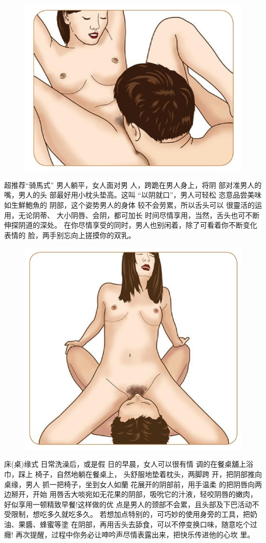 \documentclass[12pt,UTF8]{ctexbook}
\begin{document}
\begin{figure}[htbp]
	\centering
	\includegraphics[width=0.7\linewidth]{21}
	\caption{}
	\label{fig:1}
\end{figure}

超推荐“骑馬式”
男人躺平，女人面对男
人，跨跪在男人身上，将阴
部对准男人的嘴，男人的头
部最好用小枕头垫高。这叫
“以阴就口”，男人可轻松
恣意品尝美味如生鮮鮑魚的
阴部，这个姿势男人的身体
较不会劳累，所以舌头可以
很靈活的运用，无论阴蒂、
大小阴唇、会阴，都可加长
时间尽情享用，当然，舌头也可不断伸探阴道的深处。
在你尽情享受的同时，男人也别闲着，除了可看着你不断变化表情的
脸，两手别忘向上搓摸你的双乳。

\begin{figure}[htbp]
	\centering
	\includegraphics[width=0.7\linewidth]{22}
	\caption{}
	\label{fig:1}
\end{figure}

床(桌)缘式
日常洗澡后，或是假
日的早晨，女人可以很有情
调的在餐桌舖上浴巾，踩上
椅子，自然地躺在餐桌上，
头舒服地垫着枕头，两脚跨
开，把阴部推向桌缘，男人
抓一把椅子，坐到女人如蘭
花展开的阴部前，用手温柔
的把阴唇向两边掰开，开始
用唇舌大啖宛如无花果的阴部，吸吮它的汁液，轻咬阴唇的嫩肉，好似享用一顿精致早餐!这样做的优
点是男人的颈部不会累，且头部及下巴活动不受限制，想吃多久就吃多久。
若想加点特别的，可巧妙的使用身旁的工具，把奶油、果醬、蜂蜜等塗
在阴部，再用舌头去舔食，可以不停变换口味，随意吃个过癮!
再次提醒，过程中你务必让呻吟声尽情表露出来，把快乐传进他的心坎
里。
\end{document}
